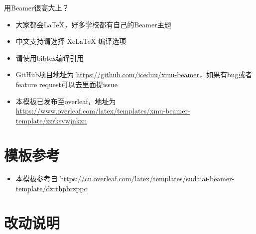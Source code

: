 \documentclass{beamer}
\begin{document}
\begin{frame}{用Beamer很高大上？}
    \begin{itemize}[<+-| alert@+>] %
        \item 大家都会\LaTeX{}，好多学校都有自己的\textrm{Beamer}主题
        \item 中文支持请选择 Xe\LaTeX{} 编译选项
        \item 请使用bibtex编译引用
        \item GitHub项目地址为 \href{https://github.com/iceduu/xmu-beamer}{https://github.com/iceduu/xmu-beamer}，如果有bug或者feature request可以去里面提issue
        \item 本模板已发布至overleaf，地址为 \href{https://www.overleaf.com/latex/templates/xmu-beamer-template/zzrksvwjnkzn}{https://www.overleaf.com/latex/templates/xmu-beamer-template/zzrksvwjnkzn}
    \end{itemize}
\end{frame}


\section{模板参考}

\begin{frame}
    \begin{itemize}
        \item 本模板参考自 \url{https://cn.overleaf.com/latex/templates/sudaiai-beamer-template/dzrthpbrzppc}\cite{origin}
    \end{itemize}
\end{frame}


\section{改动说明}

\end{document}
